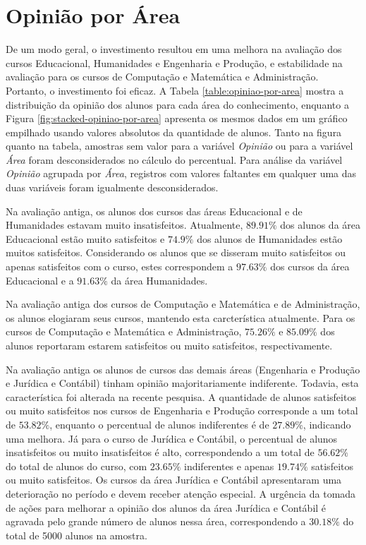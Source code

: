 \documentclass[10pt,a4paper,oneside]{article}
\newcommand{\adm}{Administração\xspace}
\newcommand{\comp}{Computação e Matemática\xspace}
\newcommand{\edu}{Educacional\xspace}
\newcommand{\eng}{Engenharia e Produção\xspace}
\newcommand{\hum}{Humanidades\xspace}
\newcommand{\jur}{Jurídica e Contábil\xspace}
\begin{document}
\FloatBarrier
\section{Opinião por Área}
\label{section:opiniao-area}

De um modo geral, o investimento resultou em uma melhora na avaliação dos cursos \edu, \hum e \eng, e estabilidade na avaliação para os cursos de \comp e \adm. Portanto, o investimento foi eficaz. A Tabela \ref{table:opiniao-por-area} mostra a distribuição da opinião dos alunos para cada área do conhecimento, enquanto a Figura \ref{fig:stacked-opiniao-por-area} apresenta os mesmos dados em um gráfico empilhado usando valores absolutos da quantidade de alunos. Tanto na figura quanto na tabela, amostras sem valor para a variável \textit{Opinião} ou para a variável \textit{Área} foram desconsiderados no cálculo do percentual. Para análise da variável \textit{Opinião} agrupada por \textit{Área}, registros com valores faltantes em qualquer uma das duas variáveis foram igualmente desconsiderados.

Na avaliação antiga, os alunos dos cursos das áreas \edu e de \hum estavam muito insatisfeitos. Atualmente, $89.91\%$ dos alunos da área \edu estão muito satisfeitos e $74.9\%$ dos alunos de \hum estão muitos satisfeitos. Considerando os alunos que se disseram muito satisfeitos ou apenas satisfeitos com o curso, estes correspondem a $97.63\%$ dos cursos da área \edu e a $91.63\%$ da área \hum.

Na avaliação antiga dos cursos de \comp e de \adm, os alunos elogiaram seus cursos, mantendo esta carcterística atualmente. Para os cursos de \comp e \adm, $75.26\%$ e $85.09\%$ dos alunos reportaram estarem satisfeitos ou muito satisfeitos, respectivamente.

Na avaliação antiga os alunos de cursos das demais áreas (\eng e \jur) tinham opinião majoritariamente indiferente. Todavia, esta característica foi alterada na recente pesquisa. A quantidade de alunos satisfeitos ou muito satisfeitos nos cursos de \eng corresponde a um total de $53.82\%$, enquanto o percentual de alunos indiferentes é de $27.89\%$, indicando uma melhora. Já para o curso de Jurídica e Contábil, o percentual de alunos insatisfeitos ou muito insatisfeitos é alto, correspondendo a um total de $56.62\%$ do total de alunos do curso, com $23.65\%$ indiferentes e apenas $19.74\%$ satisfeitos ou muito satisfeitos. Os cursos da área  \jur apresentaram uma deterioração no período e devem receber atenção especial. A urgência da tomada de ações para melhorar a opinião dos alunos da área \jur é agravada pelo grande número de alunos nessa área, correspondendo a  $30.18\%$ do total de 5000 alunos na amostra.
\end{document}
